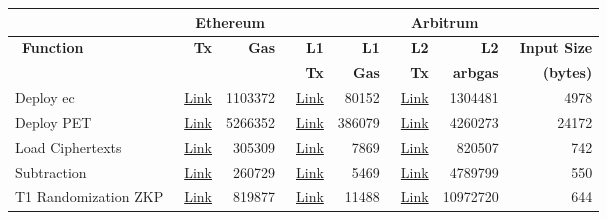 \begin{table}[!h]
	\centering
	\begin{tabular}{|l|r|r|r|r|r|r|r|}
		\hline
		&    \multicolumn{2}{c|}{~\textbf{Ethereum}} & \multicolumn{5}{c|}{~\textbf{Arbitrum}} \\ \hline
		~\textbf{Function}  &~\textbf{Tx} &~\textbf{Gas}   & ~\textbf{ L1} & ~\textbf{L1}  & ~\textbf{L2} &~\textbf{L2}& ~\textbf{Input Size} \\ 
		& &  &~\textbf{Tx} &  ~\textbf{Gas} & ~\textbf{Tx}&~\textbf{arbgas}& ~\textbf{(bytes)} \\ 
		\hline
		Deploy ec &  ~\href{https://kovan.etherscan.io/tx/0x088af056a640c1fe2188678e52484f89b7ba0bd9345bb0578d91c96aa480c59c}{Link}& 1103372& ~\href{https://kovan.etherscan.io/tx/0xa80f0eb0408f8f1c760abbc223b6a3b24780aba4b85f96ecbd6fb0dfe94bd606}{Link}&80152& ~\href{https://explorer.offchainlabs.com/#/tx/0x7c82717b52cb133c8855c0833d3cbf9ded19f884764fce78de3bb4e27feb63cd}{Link}&1304481&4978\\  \cline{1-8}
		
		Deploy PET &  ~\href{https://kovan.etherscan.io/tx/0xb76cda2c91907234afc0b971df893a6dbcdf83d482d2ff3d7d29b4a0b313002f}{Link}&5266352& ~\href{https://kovan.etherscan.io/tx/0x2ec73b92474c991d7b9f8ad1c46f95ef9125513897badb0c0c5faa19bd5b9a55}{Link}&386079& ~\href{https://explorer.offchainlabs.com/#/tx/0x2b1e63c81ca8ab7f4a6fe5333daab515a4e7408121771ae58e205ee037bceb50}{Link}&4260273&24172\\  \cline{1-8}
		
		Load Ciphertexts  & ~\href{https://kovan.etherscan.io/tx/0x2cb4bf0f6ce9fc7cabf0c152fdc61ccfff00a0f2e717c85da7eab806fa101b5b}{Link}&305309 &  \href{https://kovan.etherscan.io/tx/0x612e19481fff4ddd1c2dfe260908f15c7c74072a1e733597b4bab1c1209169f4}{Link}& 7869 &\href{https://explorer.offchainlabs.com/#/tx/0x28b3fa1a91d6d6e13005d352940861a026ac029fbc13a58dc969e98ffb5b392c}{Link} &  820507& 742\\  \cline{1-8}
		
		Subtraction & ~\href{https://kovan.etherscan.io/tx/0x6eeb3031c81af252df1fb806ae0a57643c20792df7336004465c6a74792c0016}{Link}&260729 & ~\href{https://kovan.etherscan.io/tx/0xa31a5653f3bfbdf7bcce4520c2a4f0e8d38fbc5c19036548199f805a4997cf68}{Link} & 5469& ~\href{https://explorer.offchainlabs.com/#/tx/0xbeff60af08f1b88deabe690322e26794d87595b332f1f1d01095a6a4528c4254}{Link} & 4789799& 550\\  \cline{1-8}
		
		T1 Randomization ZKP &~\href{https://kovan.etherscan.io/tx/0x30e8ccff5af6f3489ba2dc11e3198f0216487f380aa2a66ddf97e94650490e88}{Link} &819877 &  ~\href{https://kovan.etherscan.io/tx/0xc08cc82908b7e87e8ddc75695c4f29c3bce3d9a8caced144f003c59e23f4690e}{Link}&  11488&  ~\href{https://explorer.offchainlabs.com/#/tx/0xe3d1ba8bc653397dd67f3bfb602db0acce617668dc2ae2f30e038b4137a60e24}{Link}& 10972720& 644\\  \cline{1-8}
		

\end{tabular}
\end{table}
